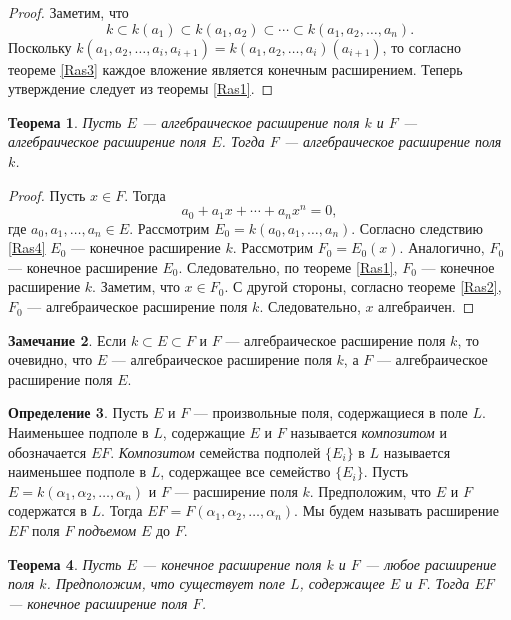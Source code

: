 \documentclass[12pt, titlepage, oneside]{amsbook}
\newtheorem{theorem}{Теорема}[chapter]
\theoremstyle{definition}
\newtheorem{definition}[theorem]{Определение}
\newtheorem{remark}[theorem]{Замечание}
\theoremstyle{remark}
\begin{document}
\begin{proof}
Заметим, что $$k\subset k(a_1)\subset k(a_1,a_2)\subset\cdots \subset k(a_1,a_2,\ldots,a_n).$$ Поскольку $k(a_1,a_2,\ldots,a_i, a_{i+1})=k(a_1,a_2,\ldots,a_i)(a_{i+1})$, то согласно теореме \ref{Ras3} каждое вложение является конечным расширением. Теперь утверждение следует из теоремы \ref{Ras1}.
\end{proof}

\begin{theorem}
\label{Ras5}
Пусть $E$ --- алгебраическое расширение поля $k$ и $F$ --- алгебраическое расширение поля $E$. Тогда $F$ --- алгебраическое расширение поля $k$.
\end{theorem}

\begin{proof}
Пусть $x\in F$. Тогда $$a_0+a_1x+\cdots+a_n x^n=0,$$ где $a_0,a_1,\ldots,a_n\in E$. Рассмотрим $E_0=k(a_0,a_1,\ldots,a_n)$. Согласно следствию \ref{Ras4} $E_0$ --- конечное расширение $k$. Рассмотрим $F_0=E_0(x)$. Аналогично, $F_0$ --- конечное расширение $E_0$. Следовательно, по теореме \ref{Ras1}, $F_0$ --- конечное расширение $k$. Заметим, что $x\in F_0$. С другой стороны, согласно теореме \ref{Ras2}, $F_0$ --- алгебраическое расширение поля $k$. Следовательно, $x$ алгебраичен.
\end{proof}

\begin{remark}
Если $k\subset E\subset F$ и $F$ --- алгебраическое расширение поля $k$, то очевидно, что $E$ --- алгебраическое расширение поля $k$, а $F$ --- алгебраическое расширение поля $E$.
\end{remark}

\begin{definition}
Пусть $E$ и $F$ --- произвольные поля, содержащиеся в поле $L$. Наименьшее подполе в $L$, содержащие $E$ и $F$ называется \emph{композитом} и обозначается $EF$. \emph{Композитом} семейства подполей $\{E_i\}$ в $L$ называется наименьшее подполе в $L$, содержащее все семейство $\{E_i\}$. Пусть $E=k(\alpha_1,\alpha_2,\ldots,\alpha_n)$ и $F$ --- расширение поля $k$. Предположим, что $E$ и $F$ содержатся в $L$. Тогда $EF=F(\alpha_1,\alpha_2,\ldots,\alpha_n)$. Мы будем называть расширение $EF$ поля $F$ \emph{подъемом} $E$ до $F$.
\end{definition}

\begin{theorem}
\label{Ras6}
Пусть $E$ --- конечное расширение поля $k$ и $F$ --- любое расширение поля $k$. Предположим, что существует поле $L$, содержащее $E$ и $F$. Тогда $EF$ --- конечное расширение поля $F$.
\end{theorem}
\end{document}
